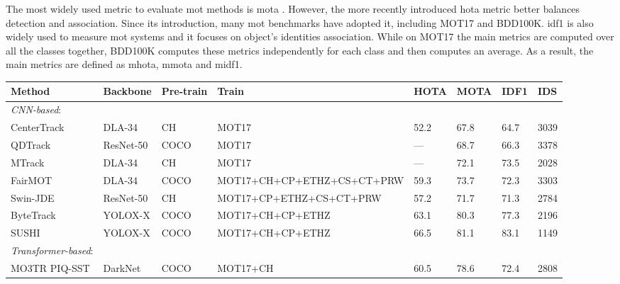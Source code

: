  The most widely used metric to evaluate \ac{mot} methods is \ac{mota} \cite{Bernardin2008EvaluatingMO}. However, the more recently introduced \ac{hota} \cite{Luiten2020IJCV} metric better balances detection and association. Since its introduction, many \ac{mot} benchmarks have adopted it, including MOT17 and BDD100K. \ac{idf1} \cite{10.1007/978-3-319-48881-3_2} is also widely used to measure \ac{mot} systems and it focuses on object's identities association. While on MOT17 the main metrics are computed over all the classes together, BDD100K computes these metrics independently for each class and then computes an average. As a result, the main metrics are defined as \ac{mhota}, \ac{mmota} and \ac{midf1}. 

\begin{table*}[t]
    \centering \footnotesize
    \begin{tabular}{llllllll}
         \toprule
        Method             & Backbone   & Pre-train & Train  & HOTA & MOTA & IDF1  & IDS \\ 
        \midrule
        \textit{CNN-based}: &&&&&&& \\
        CenterTrack \cite{zhou2020tracking}    &  DLA-34 & CH      & MOT17      & 52.2   & 67.8      & 64.7      & 3039  \\
        QDTrack \cite{cvpr_qdtrack}    & ResNet-50 & COCO      & MOT17      & ---   & 68.7      & 66.3      & 3378  \\
        MTrack \cite{yu2022towards}    & DLA-34    & CH        & MOT17      & ---   & 72.1      & 73.5      & 2028  \\
        FairMOT \cite{zhang2021fairmot}& DLA-34    & COCO      & MOT17+CH+CP+ETHZ+CS+CT+PRW & 59.3  & 73.7      & 72.3      & 3303  \\ 
        Swin-JDE \cite{tsai2023swinJDE}& ResNet-50 & CH        & MOT17+CP+ETHZ+CS+CT+PRW & 57.2   & 71.7  & 71.3 & 2784 \\
        ByteTrack \cite{ByteTrack}     & YOLOX-X   & COCO      & MOT17+CH+CP+ETHZ  & 63.1 & 80.3   & 77.3      & 2196 \\
        SUSHI \cite{Cetintas_2023_CVPR}     & YOLOX-X   & COCO      & MOT17+CH+CP+ETHZ  & 66.5 & 81.1   & 83.1      & 1149 \\
         \midrule
        \textit{Transformer-based}: &&&&&&& \\
        MO3TR PIQ-SST \cite{zhu2022looking} & DarkNet & COCO      & MOT17+CH  & 60.5      & 78.6     & 72.4 & 2808 \\

\end{tabular}
\end{table*}
